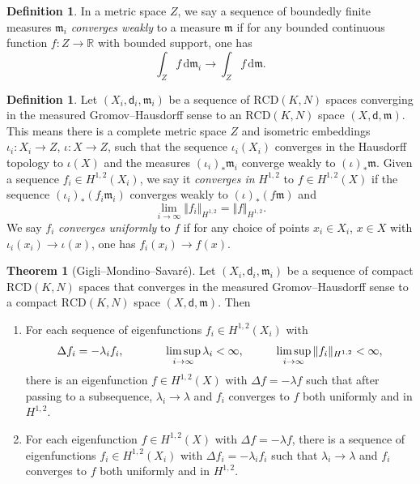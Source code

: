 \documentclass[12pt]{amsart}
\theoremstyle{definition}
\def\fnum{equation}
\newtheorem{theorem}[\fnum]{Theorem}
\newtheorem{definition}[\fnum]{Definition}
\numberwithin{equation}{section}
\newcommand{\sobo}{H^{1,2}}
\newcommand{\rcd}{\text{RCD}}
\newcommand{\mm}{\mathfrak{m}}
\begin{document}
\begin{definition}
In a %
metric space $Z$, we say a sequence of boundedly finite measures $\mm_i$ \emph{converges weakly} to a measure $\mm$ if for any bounded continuous function $f: Z \to \mathbb{R}$ with bounded support, one has
\[      \int_{Z}   f \,  \text{d} \mm _i \to \int_Z   f \, \text{d} \mm    .                 \]
\end{definition}




\begin{definition}
Let $(X_i, \mathsf{d}_i, \mm_i ) $ be a sequence of $\rcd (K,N)$ spaces converging in the measured Gromov--Hausdorff sense to an $\rcd (K,N)$ space $(X,\mathsf{d}, \mm )$. This means there is a complete metric space $Z$ and isometric embeddings $\iota_ i : X_i \to Z$, $\iota : X \to Z$, such that the sequence $\iota _i (X_i)$ converges in the Hausdorff topology to $\iota (X)$ and the measures $( \iota _i )_{\ast} \mm _i $ converge weakly to $(\iota )_{\ast} \mm $. Given a sequence $ f  _i \in \sobo (X_i )$, we say it \emph{converges in} $\sobo$  to $ f \in \sobo  (X)$ if the sequence $ ( \iota _i )_{\ast} ( f_i \mm _i ) $ converges weakly to $(\iota)_{\ast} (f \mm )$ and 
\[ \lim_{i \to \infty } \Vert f _i \Vert _{\sobo } = \Vert f \Vert _{\sobo } . \]
We say $f_i$ \emph{converges uniformly} to $f$ if for any choice of points $x_i \in X_i$, $x \in X$ with $\iota _i (x_i)  \to  \iota (x) $, one has $f _i (x_i) \to f (x)$. 
\end{definition}


\begin{theorem}[Gigli--Mondino--Savar\'e]\label{thm:spectrum-continuity}
    Let $(X_i, \mathsf{d}_i, \mm _i) $ be a sequence of compact $\rcd (K,N)$ spaces that converges in the measured Gromov--Hausdorff sense to a compact $\rcd (K,N)$ space $(X,\mathsf{d},\mm )$. Then
    \begin{enumerate}[1.]
        \item  For each sequence of eigenfunctions $f _i \in \sobo (X_i)$ with 
        \[  \Delta f_i = - \lambda _i f_i  ,\hspace{1.3cm}  \limsup_{i \to \infty } \lambda_i < \infty  , \hspace{1cm} \limsup_{i \to \infty } \Vert f _i\Vert _{\sobo} < \infty , \]
        there is an eigenfunction $f \in \sobo (X)$ with $\Delta f = - \lambda f $ such that after passing to a subsequence, $\lambda _i \to \lambda$ and $f_i$ converges to $f$ both uniformly and in  $\sobo$.\label{thm:spectrum-continuity-1}

        \item  For each eigenfunction $f \in \sobo (X)$ with $\Delta f = - \lambda f $, there is a sequence of eigenfunctions $f_i \in \sobo (X_i)$ with $\Delta f_i = - \lambda _i f_i$ such that  $\lambda_i \to \lambda$ and $f_i$ converges to $f $ both uniformly and in $\sobo $. \label{thm:spectrum-continuity-2}
    \end{enumerate}
\end{theorem}
\end{document}
